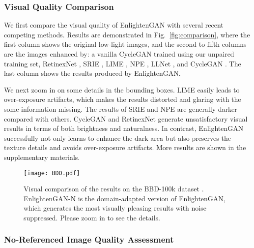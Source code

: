 \documentclass[journal]{IEEEtran}
\begin{document}
\subsubsection{Visual Quality Comparison}
\label{visual}
We first compare the visual quality of EnlightenGAN with several recent competing methods. Results are demonstrated in Fig.~\ref{fig:comparison}, where the first column shows the original low-light images, and the second to fifth columns are the images enhanced by: a vanilla CycleGAN \cite{zhu2017unpaired} trained using our unpaired training set, RetinexNet \cite{wei2018deep}, SRIE \cite{fu2016weighted}, LIME  \cite{guo2017lime}, NPE \cite{wang2013naturalness}, LLNet \cite{lore2017llnet}, and CycleGAN \cite{zhu2017unpaired}. The last column shows the results produced by EnlightenGAN.



We next zoom in on some details in the bounding boxes. 
LIME easily leads to over-exposure artifacts, which makes the results distorted and glaring with the some information missing.  
The results of SRIE and NPE are generally darker compared with others. 
CycleGAN and RetinexNet generate unsatisfactory visual results in terms of both brightness and naturalness. 
In contrast, EnlightenGAN successfully not only learns to enhance the dark area but also preserves the texture details and avoids over-exposure artifacts.
More results are shown in the supplementary materials.

\begin{figure*}[!ht]
\centering   
\texttt{[image: BDD.pdf]}
\caption{Visual comparison of the results on the BBD-100k dataset \cite{yu2018bdd100k}. EnlightenGAN-N is the domain-adapted version of EnlightenGAN, which generates the most visually pleasing results with noise suppressed. Please zoom in to see the details.}
\vspace{-1em}
\label{fig:BBD}
\end{figure*}


\subsubsection{No-Referenced Image Quality Assessment}
\end{document}
